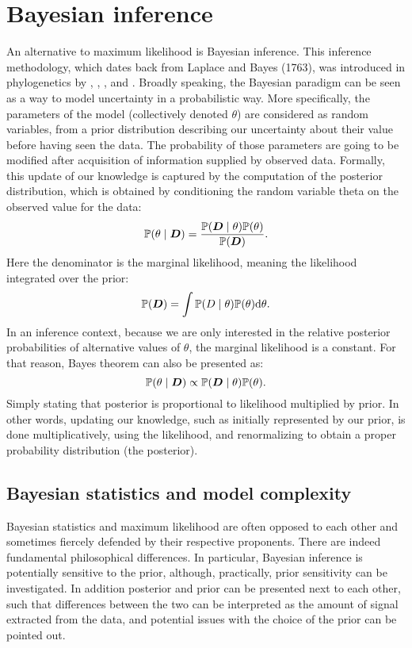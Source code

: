 \section{Bayesian inference}
\label{sec:intro-bayesian}

An alternative to maximum likelihood is Bayesian inference.
This inference methodology, which dates back from Laplace and Bayes (1763), was introduced in phylogenetics by \citet{Yang1997}, \citet{Mau1999}, \citet{Larget1999}, \citet{Li2000} and \citet{Huelsenbeck2001}.
Broadly speaking, the Bayesian paradigm can be seen as a way to model uncertainty in a probabilistic way.
More specifically, the parameters of the model (collectively denoted $\theta$) are considered as random variables, from a prior distribution describing our uncertainty about their value before having seen the data.
The probability of those parameters are going to be modified after acquisition of information supplied by observed data.
Formally, this update of our knowledge is captured by the computation of the posterior distribution, which is obtained by conditioning the random variable theta on the observed value for the data:
\begin{equation}
    \mathbb{P} (\theta \mid \bm{D})=\frac{\mathbb{P} (\bm{D} \mid \theta)\mathbb{P} (\theta)}{\mathbb{P} (\bm{D})}.
\end{equation}
Here the denominator is the marginal likelihood, meaning the likelihood integrated over the prior:
\begin{equation}
    \mathbb{P} (\bm{D}) = \int \mathbb{P} (D \mid \theta) \mathbb{P} (\theta) \mathrm{d} \theta.
\end{equation}
In an inference context, because we are only interested in the relative posterior probabilities of alternative values of $\theta$, the marginal likelihood is a constant.
For that reason, Bayes theorem can also be presented as:
\begin{equation}
    \mathbb{P} (\theta \mid \bm{D}) \propto \mathbb{P} (\bm{D} \mid \theta)\mathbb{P} (\theta).
\end{equation}
Simply stating that posterior is proportional to likelihood multiplied by prior.
In other words, updating our knowledge, such as initially represented by our prior, is done multiplicatively, using the likelihood, and renormalizing to obtain a proper probability distribution (the posterior).

\subsection{Bayesian statistics and model complexity}
\label{subsec:bayesian-statistics-and-maximum-likelihood}
Bayesian statistics and maximum likelihood are often opposed to each other and sometimes fiercely defended by their respective proponents.
There are indeed fundamental philosophical differences.
In particular, Bayesian inference is potentially sensitive to the prior, although, practically, prior sensitivity can be investigated.
In addition posterior and prior can be presented next to each other, such that differences between the two can be interpreted as the amount of signal extracted from the data, and potential issues with the choice of the prior can be pointed out.

